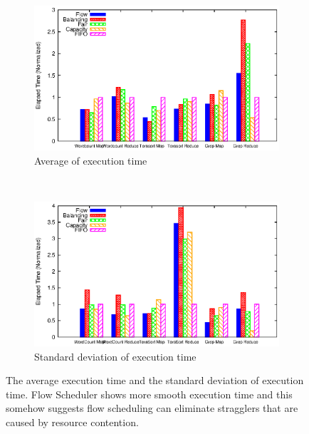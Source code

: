 \begin{figure}
    \centering
    \begin{subfigure}[b]{0.45\textwidth}
        \includegraphics[width=\textwidth]{figures/avg_time.eps}
        \caption{Average of execution time}
        \label{fig:het_analysis_avg}
    \end{subfigure}
    ~ %
    \begin{subfigure}[b]{0.45\textwidth}
        \includegraphics[width=\textwidth]{figures/std_time.eps}
        \caption{Standard deviation of execution time}
        \label{fig:het_analysis_std}
    \end{subfigure}
    \caption{The average execution time and the standard deviation of execution time.  Flow Scheduler shows more smooth execution time and this somehow suggests flow scheduling can eliminate stragglers that are caused by resource contention.}
    \label{fig:het_analysis}
\end{figure}


